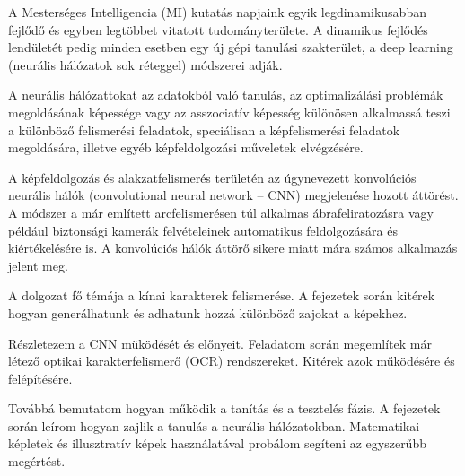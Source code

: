 
A Mesterséges Intelligencia (MI) kutatás napjaink egyik legdinamikusabban fejlődő és egyben legtöbbet vitatott tudományterülete. A dinamikus fejlődés lendületét pedig minden esetben egy új gépi tanulási szakterület, a deep learning (neurális hálózatok sok réteggel) módszerei adják.

A neurális hálózattokat az adatokból való tanulás, az optimalizálási problémák megoldásának képessége vagy az asszociatív képesség különösen alkalmassá teszi a különböző felismerési feladatok, speciálisan a képfelismerési feladatok megoldására, illetve egyéb képfeldolgozási műveletek elvégzésére.

A képfeldolgozás és alakzatfelismerés területén az úgynevezett konvolúciós neurális hálók (convolutional neural network – CNN) megjelenése hozott áttörést. A módszer a már említett arcfelismerésen túl alkalmas ábrafeliratozásra vagy például biztonsági kamerák felvételeinek automatikus feldolgozására és kiértékelésére is. A konvolúciós hálók áttörő sikere miatt mára számos alkalmazás jelent meg.

A dolgozat fő témája a kínai karakterek felismerése. A fejezetek során kitérek hogyan generálhatunk és adhatunk hozzá különböző zajokat a képekhez.

Részletezem a CNN müködését és előnyeit. Feladatom során megemlítek már létező optikai karakterfelismerő (OCR) rendszereket. Kitérek azok működésére és felépítésére.

Továbbá bemutatom hogyan működik a tanítás és a tesztelés fázis. A fejezetek során leírom hogyan zajlik a tanulás a neurális hálózatokban. Matematikai képletek és illusztratív képek használatával probálom segíteni az egyszerűbb megértést.

\begin{comment}{Ez így kicsit általános, de elég lesz a végén átfogalmazni.}
\end{comment}
